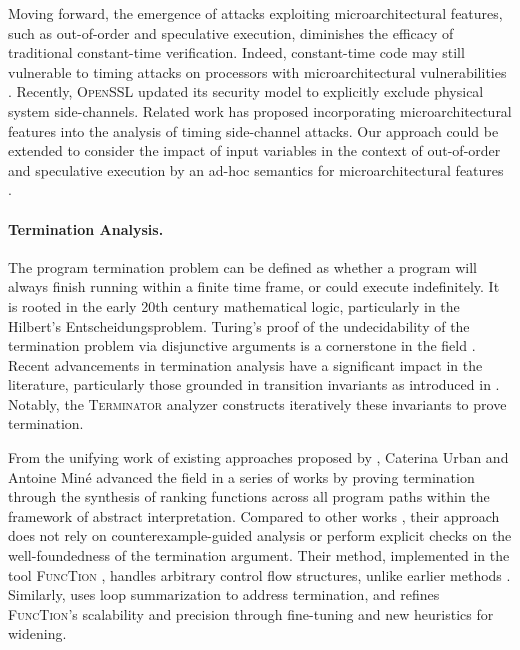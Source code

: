 Moving forward, the emergence of attacks exploiting microarchitectural features, such as out-of-order and speculative execution, diminishes the efficacy of traditional constant-time verification. Indeed, constant-time code may still vulnerable to timing attacks on processors with microarchitectural vulnerabilities . Recently, \textsc{OpenSSL} updated its security model to explicitly exclude physical system side-channels. Related work  has proposed incorporating microarchitectural features into the analysis of timing side-channel attacks. Our approach could be extended to consider the impact of input variables in the context of out-of-order and speculative execution by an ad-hoc semantics for microarchitectural features .

\paragraph{Termination Analysis.}


The program termination problem can be defined as whether a program will always finish running within a finite time frame, or could execute indefinitely.
It is rooted in the early 20th century mathematical logic, particularly in the Hilbert's Entscheidungsproblem. Turing's proof of the undecidability of the termination problem via disjunctive arguments is a cornerstone in the field .
Recent advancements in termination analysis have a significant impact in the literature, particularly those grounded in transition invariants as introduced in \textcite{Podelski2004}. Notably, the \textsc{Terminator} analyzer  constructs iteratively these invariants to prove termination.

From the unifying work of existing approaches proposed by ,
Caterina Urban and Antoine Min{\'{e}} advanced the field in a series of works  by proving termination through the synthesis of ranking functions across all program paths within the framework of abstract interpretation.
Compared to other works , their approach does not rely on counterexample-guided analysis or perform explicit checks on the well-foundedness of the termination argument. Their method, implemented in the tool \textsc{FuncTion} , handles arbitrary control flow structures, unlike earlier methods . Similarly,  uses loop summarization to address termination, and  refines \textsc{FuncTion}'s scalability and precision through fine-tuning and new heuristics for widening.

